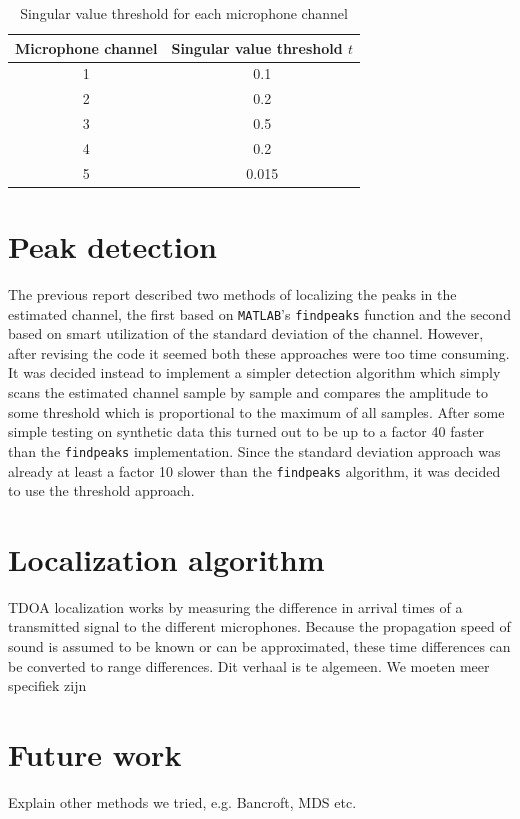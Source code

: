 \documentclass[11pt,titlepage]{report}
\begin{document}
\begin{table}[H]
\centering
\begin{tabular}{ c | c}
\hline \hline
Microphone channel & Singular value threshold $t$ \\
\hline
1 & \num{0.1} \\ 
2 & \num{0.2} \\
3 & \num{0.5} \\
4 & \num{0.2} \\
5 & \num{0.015} \\
\end{tabular}
\caption{Singular value threshold for each microphone channel}
\label{tab:loc_svd_value}
\end{table}

\section{Peak detection}
\label{sec:loc_peak}
The previous report \cite{epo4-del7} described two methods of localizing the peaks in the estimated channel, the first based on \texttt{MATLAB}'s \texttt{findpeaks} function and the second based on smart utilization of the standard deviation of the channel. However, after revising the code it seemed both these approaches were too time consuming. It was decided instead to implement a simpler detection algorithm which simply scans the estimated channel sample by sample and compares the amplitude to some threshold which is proportional to the maximum of all samples. After some simple testing on synthetic data this turned out to be up to a factor \num{40} faster than the \texttt{findpeaks} implementation. Since the standard deviation approach was already at least a factor \num{10} slower than the \texttt{findpeaks} algorithm, it was decided to use the threshold approach. 

\section{Localization algorithm}
\label{sec:loc_alg}
TDOA localization works by measuring the difference in arrival times of a transmitted signal to the different microphones. Because the propagation speed of sound is assumed to be known or can be approximated, these time differences can be converted to range differences. Dit verhaal is te algemeen. We moeten meer specifiek zijn 

\section{Future work}
\label{sec:loc_future}
Explain other methods we tried, e.g. Bancroft, MDS etc.
\end{document}
